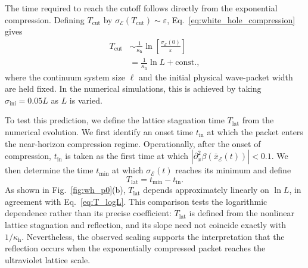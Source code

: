 \documentclass[reprint,amsmath,amssymb,aps,prb,showkeys,superscriptaddress]{revtex4-2}
\begin{document}
The time required to reach the cutoff follows directly from the
exponential compression. Defining $T_{\mathrm{cut}}$ by
$\sigma_{\mathcal E}(T_{\mathrm{cut}})\sim\varepsilon$,
Eq.~\eqref{eq:white_hole_compression} gives
\begin{align}
  T_{\mathrm{cut}}
  &\sim
  \frac{1}{\kappa_{\mathrm h}}
  \ln\left[
    \frac{\sigma_{\mathcal E}(0)}{\varepsilon}
  \right]
  \nonumber\\
  &=
  \frac{1}{\kappa_{\mathrm h}}\ln L
  +\mathrm{const.},
  \label{eq:T_logL}
\end{align}
where the continuum system size $\ell$ and the initial physical
wave-packet width are held fixed. In the numerical simulations,
this is achieved by taking
$\sigma_{\mathrm{ini}}=0.05L$ as $L$ is varied.

To test this prediction, we define the lattice stagnation time
$T_{\mathrm{lat}}$ from the numerical evolution. We first identify
an onset time $t_{\mathrm{in}}$ at which the packet enters the
near-horizon compression regime. Operationally, after the onset of
compression, $t_{\mathrm{in}}$ is taken as the first time at which
$|\partial_x^2\beta(\bar{x}_{\mathcal E}(t))|<0.1$. We then
determine the time $t_{\mathrm{min}}$ at which
$\sigma_{\mathcal E}(t)$ reaches its minimum and define
\begin{equation}
  T_{\mathrm{lat}}
  =
  t_{\mathrm{min}}-t_{\mathrm{in}}.
  \label{eq:lattice_stagnation_time}
\end{equation}
As shown in Fig.~\ref{fig:wh_p0}(b),
$T_{\mathrm{lat}}$ depends approximately linearly on $\ln L$, in
agreement with Eq.~\eqref{eq:T_logL}. This comparison tests the
logarithmic dependence rather than its precise coefficient:
$T_{\mathrm{lat}}$ is defined from the nonlinear lattice
stagnation and reflection, and its slope need not coincide exactly
with $1/\kappa_{\mathrm h}$. Nevertheless, the observed scaling
supports the interpretation that the reflection occurs when the
exponentially compressed packet reaches the ultraviolet lattice
scale.
\end{document}
